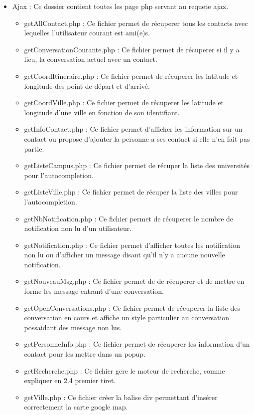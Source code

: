 \documentclass[a4paper,10pt]{report}
\begin{document}
\begin{itemize}
    \item Ajax : Ce dossier contient toutes les page php servant au requete ajax.
    \begin{itemize}
         \item getAllContact.php : Ce fichier permet de récuperer tous les contacts avec lequelles l'utilisateur courant est ami(e)s.
         \item getConversationCourante.php : Ce fichier permet de récuperer si il y a lieu, la conversation actuel avec un contact.
         \item getCoordItineraire.php : Ce fichier permet de récuperer les latitude et longitude des point de départ et d'arrivé.
         \item getCoordVille.php : Ce fichier permet de récuperer les latitude et longitude d'une ville en fonction de son identifiant.
         \item getInfoContact.php : Ce fichier permet d'afficher les information sur un contact ou propose d'ajouter la personne a ses contact
         si elle n'en fait pas partie.
         \item getListeCampus.php : Ce fichier permet de récuper la liste des universités pour l'autocompletion.
         \item getListeVille.php : Ce fichier permet de récuper la liste des villes pour l'autocompletion.
         \item getNbNotification.php : Ce fichier permet de récuperer le nombre de notification non lu d'un utilisateur.
         \item getNotification.php : Ce fichier permet d'afficher toutes les notification non lu ou d'afficher un message disant qu'il n'y a
         aucune nouvelle notification.
         \item getNouveauMsg.php : Ce fichier permet de de récuperer et de mettre en forme les message entrant d'une conversation.
         \item getOpenConversations.php : Ce fichier permet de récuperer la liste des conversation en cours et affiche un style particulier au
         conversation possaidant des message non lus.
         \item getPersonneInfo.php : Ce fichier permet de récuperer les information d'un contact pour les mettre dans un popup.
         \item getRecherche.php : Ce fichier gere le moteur de recherche, comme expliquer en 2.4 premier tiret.
         \item getVille.php : Ce fichier créer la balise div permettant d'insérer correctement la carte google map.

\end{itemize}
\end{itemize}
\end{document}
